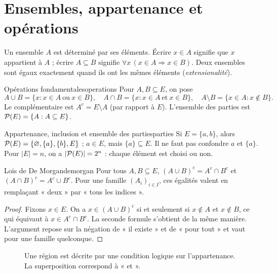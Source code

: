 \section{Ensembles, appartenance et opérations}
Un ensemble $A$ est déterminé par ses éléments. Écrire $x\in A$ signifie que $x$ appartient à $A$ ; écrire $A\subseteq B$ signifie $\forall x\,(x\in A\Rightarrow x\in B)$. Deux ensembles sont égaux exactement quand ils ont les mêmes éléments (\emph{extensionalité}).
\begin{definition}{Opérations fondamentales}{operations}
Pour $A,B\subseteq E$, on pose
\[
A\cup B=\{x:x\in A\ \text{ou}\ x\in B\},\quad
A\cap B=\{x:x\in A\ \text{et}\ x\in B\},\quad
A\setminus B=\{x\in A:x\notin B\}.
\]
Le complémentaire est $A^c=E\setminus A$ (par rapport à $E$). L'ensemble des parties est $\mathcal P(E)=\{A:A\subseteq E\}$.
\end{definition}
\begin{exemple}{Appartenance, inclusion et ensemble des parties}{parties}
Si $E=\{a,b\}$, alors $\mathcal P(E)=\{\varnothing,\{a\},\{b\},E\}$ ; $a\in E$, mais $\{a\}\subseteq E$. Il ne faut pas confondre $a$ et $\{a\}$. Pour $|E|=n$, on a $|\mathcal P(E)|=2^n$ : chaque élément est choisi ou non.
\end{exemple}
\begin{proposition}{Lois de De Morgan}{demorgan}
Pour tous $A,B\subseteq E$, $(A\cup B)^c=A^c\cap B^c$ et $(A\cap B)^c=A^c\cup B^c$. Pour une famille $(A_i)_{i\in I}$, ces égalités valent en remplaçant « deux » par « tous les indices ».
\end{proposition}
\begin{proof}Fixons $x\in E$. On a $x\in(A\cup B)^c$ si et seulement si $x\notin A$ et $x\notin B$, ce qui équivaut à $x\in A^c\cap B^c$. La seconde formule s'obtient de la même manière. L'argument repose sur la négation de « il existe » et de « pour tout » et vaut pour une famille quelconque.\end{proof}
\begin{figure}[htbp]\centering
{}
\caption{Une région est décrite par une condition logique sur l'appartenance. La superposition correspond à « et ».}
\end{figure}

